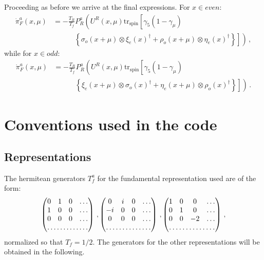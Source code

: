 \documentclass{article}[12pt]
\begin{document}
Proceeding as before we arrive at the final expressions. For $x\in even$:
\begin{align}
\dot\pi^a_F(x,\mu) &= - \frac{T_R}{T_f} P^a_R \left( U^R(x,\mu) \mathrm{tr_{spin}} \left[ \gamma_5 (1-\gamma_\mu) \right. \right. \nonumber\\
										&\quad\quad\quad	\left. \left. \left\{  \sigma_o(x+\mu)\otimes\xi_e(x)^\dagger + \rho_o(x+\mu)\otimes\eta_e(x)^\dagger \right\} \right] \right)\, ,
\end{align}
while for $x\in odd$:
\begin{align}
\dot\pi^a_F(x,\mu) &= - \frac{T_R}{T_f} P^a_R \left( U^R(x,\mu) \mathrm{tr_{spin}} \left[ \gamma_5 (1-\gamma_\mu) \right. \right. \nonumber\\
										&\quad\quad\quad	\left. \left. \left\{\xi_e(x+\mu)\otimes\sigma_o(x)^\dagger + \eta_e(x+\mu)\otimes\rho_o(x)^\dagger   \right\} \right] \right)\, .
\end{align}




\section{Conventions used in the code}

\subsection{Representations}

The hermitean generators $T^a_f$ for the fundamental representation used are of the form:
\begin{equation}
\begin{pmatrix}
0&1&0&\dots\\
1&0&0&\dots\\
0&0&0&\dots\\
\hdotsfor{4}
\end{pmatrix}\, ,
\begin{pmatrix}
0&i&0&\dots\\
-i&0&0&\dots\\
0&0&0&\dots\\
\hdotsfor{4}
\end{pmatrix}\, ,
\begin{pmatrix}
1&0&0&\dots\\
0&1&0&\dots\\
0&0&-2&\dots\\
\hdotsfor{4}
\end{pmatrix}\, ,
\end{equation}
normalized so that $T_f=1/2$. The generators for the other representations
will be obtained in the following.
\end{document}
